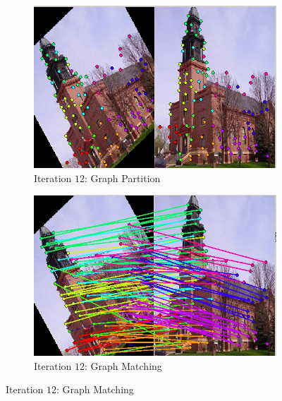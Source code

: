 \documentclass[
	fontsize=12pt,
	paper=a4,
	twoside=false,
	numbers=noenddot,
	plainheadsepline,
	toc=listof,
	toc=bibliography
]{scrartcl}
\makeatletter
\providecommand\phantomcaption{\caption@refstepcounter\@captype}
\makeatother
\begin{document}
\begin{figure}[h]
	\begin{subfigure}[b]{0.5\textwidth}
		\centering
		\includegraphics[scale=0.35]{fig/method2/test_imagetrafo3/partition_it12.jpg} 
		\caption{Iteration $12$: Graph Partition} 
	\end{subfigure}%
	\begin{subfigure}[b]{0.5\textwidth}
		\centering
		\includegraphics[scale=0.35]{fig/method2/test_imagetrafo3/LL_it12.jpg} 
		\caption{Iteration $12$: Graph Matching} 
	\end{subfigure} 
	\phantomcaption
	\end{figure}
	
\end{document}
